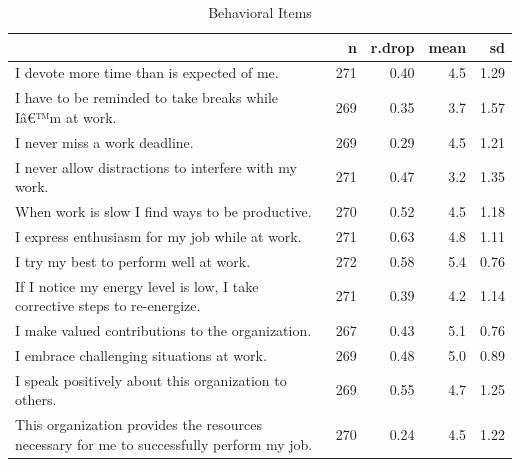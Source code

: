 \documentclass[
]{book}
\begin{document}
\begin{table}

\caption{\label{tab:rdrop2}Behavioral Items}
\centering
\begin{tabular}[t]{l|r|r|r|r}
\hline
  & n & r.drop & mean & sd\\
\hline
I devote more time than is expected of me. & 271 & 0.40 & 4.5 & 1.29\\
\hline
I have to be reminded to take breaks while Iâ€™m at work. & 269 & 0.35 & 3.7 & 1.57\\
\hline
I never miss a work deadline. & 269 & 0.29 & 4.5 & 1.21\\
\hline
I never allow distractions to interfere with my work. & 271 & 0.47 & 3.2 & 1.35\\
\hline
When work is slow I find ways to be productive. & 270 & 0.52 & 4.5 & 1.18\\
\hline
I express enthusiasm for my job while at work. & 271 & 0.63 & 4.8 & 1.11\\
\hline
I try my best to perform well at work. & 272 & 0.58 & 5.4 & 0.76\\
\hline
If I notice my energy level is low, I take corrective steps to re-energize. & 271 & 0.39 & 4.2 & 1.14\\
\hline
I make valued contributions to the organization. & 267 & 0.43 & 5.1 & 0.76\\
\hline
I embrace challenging situations at work. & 269 & 0.48 & 5.0 & 0.89\\
\hline
I speak positively about this organization to others. & 269 & 0.55 & 4.7 & 1.25\\
\hline
This organization provides the resources necessary for me to successfully perform my job. & 270 & 0.24 & 4.5 & 1.22\\
\hline
\end{tabular}
\end{table}
\end{document}
